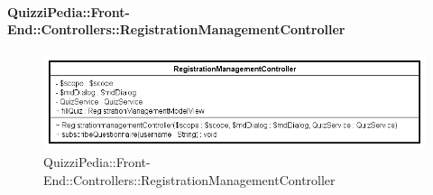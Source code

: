 \paragraph{QuizziPedia::Front-End::Controllers::RegistrationManagementController}
\begin{figure} [ht]
	\centering
	\includegraphics[scale=0.80]{UML/Classi/Front-End/QuizziPedia_Front-end_Controller_RegistrationManagementController.png}
	\caption{QuizziPedia::Front-End::Controllers::RegistrationManagementController}
\end{figure} \FloatBarrier
